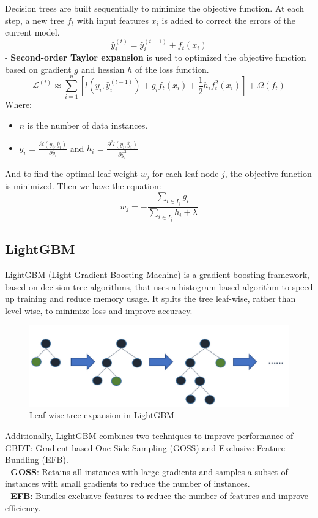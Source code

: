 \documentclass{ieeeojies}
\begin{document}
Decision trees are built sequentially to minimize the objective function. At each step, a new tree \(f_t\) with input features \(x_i\) is added to correct the errors of the current model.
\begin{dmath*}
    \hat{y}_i^{(t)} = \hat{y}_i^{(t-1)} + f_t(x_i)
\end{dmath*}
- \textbf{Second-order Taylor expansion} is used to optimized the objective function based on gradient \(g\) and hessian \(h\) of the loss function.
\begin{dmath*}
    \mathcal{L}^{(t)} \approx \sum_{i=1}^n [l(y_i, \hat{y}_i^{(t-1)}) + g_i f_t(x_i) + \frac{1}{2} h_i f_t^2(x_i)] + \Omega(f_t)
\end{dmath*}
Where:
\begin{itemize}
    \item \(n\) is the number of data instances.
    \item \(g_i\) = \(\frac{\partial l(y_i, \hat{y}_i)}{\partial \hat{y}_i}\) and \(h_i\) = \(\frac{\partial^2 l(y_i, \hat{y}_i)}{\partial \hat{y}_i^2}\)
\end{itemize}
And to find the optimal leaf weight \(w_j\) for each leaf node \(j\), the objective function is minimized. Then we have the equation:
\begin{dmath*}
    w_j = -\frac{\sum_{i \in I_j} g_i}{\sum_{i \in I_j} h_i + \lambda}
\end{dmath*}
\subsection{LightGBM}
LightGBM (Light Gradient Boosting Machine) is a gradient-boosting framework, based on decision tree algorithms, that uses a histogram-based algorithm to speed up training and reduce memory usage. It splits the tree leaf-wise, rather than level-wise, to minimize loss and improve accuracy.\\
\begin{figure}[H]
    \centering
    \includegraphics[width=0.8\linewidth]{./image/LightGBM.png}
    \caption{Leaf-wise tree expansion in LightGBM}
    \label{fig:11}
\end{figure}
Additionally, LightGBM combines two techniques to improve performance of GBDT: Gradient-based One-Side Sampling (GOSS) and Exclusive Feature Bundling (EFB).\\
- \textbf{GOSS}: Retains all instances with large gradients and samples a subset of instances with small gradients to reduce the number of instances.\\
- \textbf{EFB}: Bundles exclusive features to reduce the number of features and improve efficiency.
\end{document}
